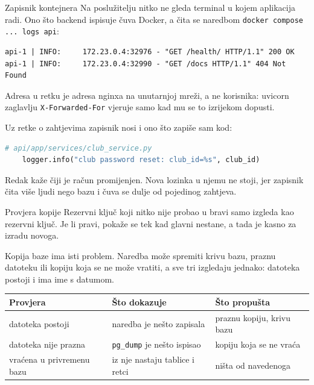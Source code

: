 \begin{frame}[fragile]{Zapisnik kontejnera}
Na poslužitelju nitko ne gleda terminal u kojem aplikacija radi. Ono što backend ispisuje čuva Docker, a čita se naredbom \texttt{docker compose ... logs api}:

\begin{lstlisting}
api-1 | INFO:     172.23.0.4:32976 - "GET /health/ HTTP/1.1" 200 OK
api-1 | INFO:     172.23.0.4:32990 - "GET /docs HTTP/1.1" 404 Not Found
\end{lstlisting}

\vspace{0.2em}
Adresa u retku je adresa nginxa na unutarnjoj mreži, a ne korisnika: uvicorn zaglavlju \texttt{X-Forwarded-For} vjeruje samo kad mu se to izrijekom dopusti.

\vspace{0.2em}
Uz retke o zahtjevima zapisnik nosi i ono što zapiše sam kod:

\begin{lstlisting}[language=python]
# api/app/services/club_service.py
    logger.info("club password reset: club_id=%s", club_id)
\end{lstlisting}

\vspace{0.2em}
Redak kaže čiji je račun promijenjen. Nova lozinka u njemu ne stoji, jer zapisnik čita više ljudi nego bazu i čuva se dulje od pojedinog zahtjeva.
\end{frame}

\begin{frame}{Provjera kopije}
Rezervni ključ koji nitko nije probao u bravi samo izgleda kao rezervni ključ. Je li pravi, pokaže se tek kad glavni nestane, a tada je kasno za izradu novoga.

\vspace{0.5em}
Kopija baze ima isti problem. Naredba može spremiti krivu bazu, praznu datoteku ili kopiju koja se ne može vratiti, a sve tri izgledaju jednako: datoteka postoji i ima ime s datumom.

\vspace{0.5em}
\begin{center}
{\small
\setlength{\tabcolsep}{5pt}
\renewcommand{\arraystretch}{1.3}
\begin{tabular}{@{}L{3.6cm}L{3.9cm}L{3.6cm}@{}}
  \toprule
  \textbf{Provjera} & \textbf{Što dokazuje} & \textbf{Što propušta} \\
  \midrule
  datoteka postoji & naredba je nešto zapisala & praznu kopiju, krivu bazu \\
  datoteka nije prazna & \texttt{pg\_dump} je nešto ispisao & kopiju koja se ne vraća \\
  vraćena u privremenu bazu & iz nje nastaju tablice i retci & ništa od navedenoga \\
  \bottomrule
\end{tabular}
}
\end{center}
\end{frame}


